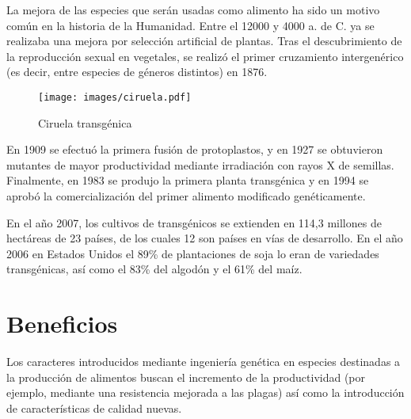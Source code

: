 \documentclass[11pt,twoside]{article}
\begin{document}
La mejora de las especies que serán usadas como alimento ha sido un motivo común en la historia de la Humanidad.
 Entre el 12000 y 4000 a. de C. ya se realizaba una mejora por selección artificial de plantas. Tras el descubrimiento de la reproducción sexual en vegetales, se realizó el primer cruzamiento intergenérico (es decir, entre especies de géneros distintos) en 1876. 
 
 
 
 
%



\begin{figure}[h!]
\begin{center}
\texttt{[image: images/ciruela.pdf]}
\end{center}
\caption{Ciruela transgénica}\label{fig.ciruela}
\end{figure}



En 1909 se efectuó la primera fusión de protoplastos, y en 1927 se obtuvieron mutantes de mayor productividad mediante irradiación con rayos X de semillas.
Finalmente, en 1983 se produjo la primera planta transgénica y en 1994 se aprobó la comercialización del primer alimento modificado genéticamente.

En el año 2007, los cultivos de transgénicos se extienden en 114,3 millones de hectáreas de 23 países, de los cuales 12 son países en vías de desarrollo.
 En el año 2006 en Estados Unidos el 89\% de plantaciones de soja lo eran de variedades transgénicas, así como el 83\% del algodón y el 61\% del maíz. 










\section{Beneficios}\label{seccion.beneficios}


Los caracteres introducidos mediante ingeniería genética en especies destinadas a la producción de alimentos buscan el incremento de la productividad (por ejemplo, mediante una resistencia mejorada a las plagas) así como la introducción de características de calidad nuevas.
\end{document}
